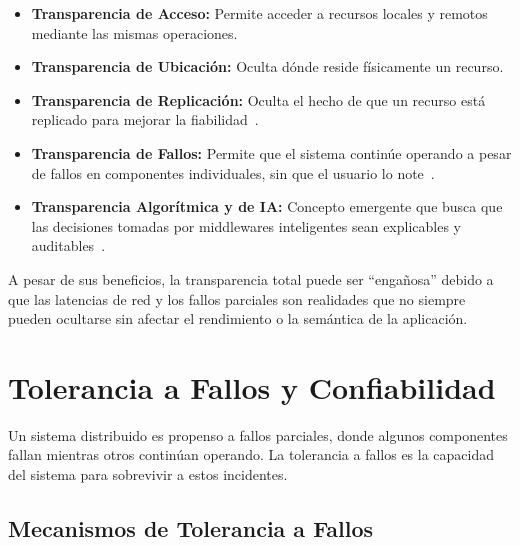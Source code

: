 \documentclass[12pt,a4paper]{article}
\begin{document}
\begin{itemize}
    \item \textbf{Transparencia de Acceso:} Permite acceder a recursos locales y remotos mediante las mismas operaciones.

    \item \textbf{Transparencia de Ubicación:} Oculta dónde reside físicamente un recurso.

    \item \textbf{Transparencia de Replicación:} Oculta el hecho de que un recurso está replicado para mejorar la fiabilidad~\cite{r15}.

    \item \textbf{Transparencia de Fallos:} Permite que el sistema continúe operando a pesar de fallos en componentes individuales, sin que el usuario lo note~\cite{r16}.

    \item \textbf{Transparencia Algorítmica y de IA:} Concepto emergente que busca que las decisiones tomadas por middlewares inteligentes sean explicables y auditables~\cite{r03}.
\end{itemize}

A pesar de sus beneficios, la transparencia total puede ser ``engañosa'' debido a que las latencias de red y los fallos parciales son realidades que no siempre pueden ocultarse sin afectar el rendimiento o la semántica de la aplicación.

\section{Tolerancia a Fallos y Confiabilidad}

Un sistema distribuido es propenso a fallos parciales, donde algunos componentes fallan mientras otros continúan operando. La tolerancia a fallos es la capacidad del sistema para sobrevivir a estos incidentes.

\subsection{Mecanismos de Tolerancia a Fallos}
\end{document}
